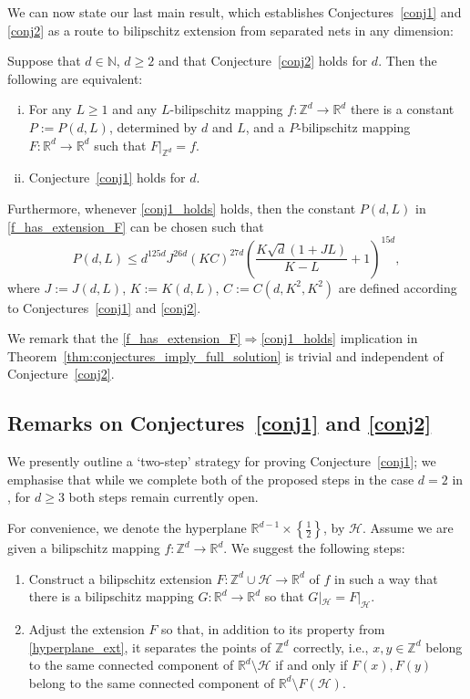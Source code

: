 \documentclass[a4paper, bibliography=totoc]{scrartcl}
\numberwithin{claimcounter}{define}
\newcommand{\R}{\mathbb{R}}
\newcommand{\Z}{\mathbb{Z}}
\newcommand{\N}{\mathbb{N}}
\newcommand{\rest}[2]{#1|_{#2}} %
\newcommand{\mc}[1]{\mathcal{#1}}
\newcommand{\set}[1]{\left\{#1\right\}}
\newcommand{\br}[1]{\left(#1\right)}
\begin{document}
We can now state our last main result, which establishes Conjectures~\ref{conj1} and \ref{conj2} as a route to bilipschitz extension from separated nets in any dimension:
\begin{thm}\label{thm:conjectures_imply_full_solution}
	Suppose that $d\in\N$, $d\geq 2$ and that Conjecture~\ref{conj2} holds for $d$. Then the following are equivalent:
	\begin{enumerate}[(i)]
		\item\label{f_has_extension_F} For any $L\geq 1$ and any $L$-bilipschitz mapping $f\colon \Z^{d}\to \R^{d}$ there is a constant $P:=P(d,L)$, determined by $d$ and $L$, and a $P$-bilipschitz mapping $F\colon \R^{d}\to\R^{d}$ such that $F|_{\Z^{d}}=f$.
		\item\label{conj1_holds} Conjecture~\ref{conj1} holds for $d$.
	\end{enumerate}
	Furthermore, whenever \eqref{conj1_holds} holds, then the constant $P(d,L)$ in \eqref{f_has_extension_F} can be chosen such that
	\begin{equation*}
	P(d,L)\leq d^{125d}J^{26d}\br{KC}^{27d}\br{\frac{K\sqrt{d}(1+JL)}{K-L}+1}^{15d},
	\end{equation*}
	where $J:=J(d,L)$, $K:=K(d,L)$, $C:=C(d,K^{2},K^{2})$ are defined according to Conjectures~\ref{conj1} and \ref{conj2}.
\end{thm}
We remark that the \eqref{f_has_extension_F}$\Rightarrow$\eqref{conj1_holds} implication in Theorem~\ref{thm:conjectures_imply_full_solution} is trivial and independent of Conjecture~\ref{conj2}.
\subsection*{Remarks on Conjectures~\ref{conj1} and \ref{conj2}}
We presently outline a `two-step' strategy for proving Conjecture~\ref{conj1}; we emphasise that while we complete both of the proposed steps in the case $d=2$ in \cite{DK_2dim}, for $d\geq 3$ both steps remain currently open.

For convenience, we denote the hyperplane $\R^{d-1}\times\set{\frac{1}{2}}$, by $\mc{H}$. Assume we are given a bilipschitz mapping $f\colon\Z^d\to\R^d$. We suggest the following steps:
\begin{enumerate}[(1)]
	\item\label{hyperplane_ext} Construct a bilipschitz extension $F\colon \Z^d\cup\mc{H}\to\R^d$ of $f$ in such a way that there is a bilipschitz mapping $G\colon\R^d\to\R^d$ so that $\rest{G}{\mc{H}}=\rest{F}{\mc{H}}$.
	
	\item\label{correct_hyperplane} Adjust the extension $F$ so that, in addition to its property from \eqref{hyperplane_ext}, it separates the points of $\Z^d$ correctly, i.e., $x,y\in \Z^d$ belong to the same connected component of $\R^d\setminus \mc{H}$ if and only if $F(x), F(y)$ belong to the same connected component of $\R^d\setminus F\br{\mc{H}}$.
\end{enumerate}
\end{document}
